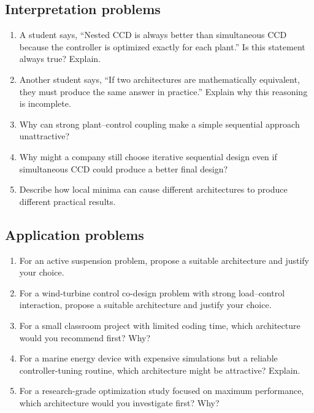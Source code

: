 \documentclass[11pt]{article}
\begin{document}
\subsection*{Interpretation problems}
\begin{enumerate}[leftmargin=1.5em,label=\textbf{P\arabic*.},resume]
  \item A student says, ``Nested CCD is always better than simultaneous CCD because the controller is optimized exactly for each plant.'' Is this statement always true? Explain.
  \item Another student says, ``If two architectures are mathematically equivalent, they must produce the same answer in practice.'' Explain why this reasoning is incomplete.
  \item Why can strong plant--control coupling make a simple sequential approach unattractive?
  \item Why might a company still choose iterative sequential design even if simultaneous CCD could produce a better final design?
  \item Describe how local minima can cause different architectures to produce different practical results.
\end{enumerate}

\subsection*{Application problems}
\begin{enumerate}[leftmargin=1.5em,label=\textbf{P\arabic*.},resume]
  \item For an active suspension problem, propose a suitable architecture and justify your choice.
  \item For a wind-turbine control co-design problem with strong load--control interaction, propose a suitable architecture and justify your choice.
  \item For a small classroom project with limited coding time, which architecture would you recommend first? Why?
  \item For a marine energy device with expensive simulations but a reliable controller-tuning routine, which architecture might be attractive? Explain.
  \item For a research-grade optimization study focused on maximum performance, which architecture would you investigate first? Why?
\end{enumerate}
\end{document}
